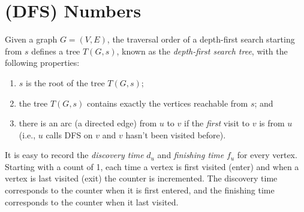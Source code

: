 \section{(DFS) Numbers}

Given a graph $G = (V,E)$, the traversal order of a depth-first search starting
from $s$ defines a tree $T(G, s)$, known as the \emph{depth-first search tree},
with the following properties:
\begin{enumerate}[itemsep=2pt,topsep=0pt,label=(\roman*),
  labelindent=2\parindent,
  leftmargin=*]
\item $s$ is the root of the tree $T(G,s)$;
\item the tree $T(G,s)$ contains exactly the vertices reachable from $s$; and
\item there is an arc (a directed edge) from $u$ to $v$ if the
  \emph{first} visit to $v$ is
from $u$ (i.e., $u$ calls DFS on $v$ and $v$ hasn't been visited before).
\end{enumerate}

It is easy to record the \emph{discovery time} $d_u$ and
\emph{finishing time} $f_u$ for every vertex.  Starting with a count
of 1, each time a vertex is
first visited (enter) and when a vertex is
last visited (exit) the counter is incremented.  The discovery time
corresponds to the counter when it is first entered, and the finishing
time corresponds to the counter when it last visited.

